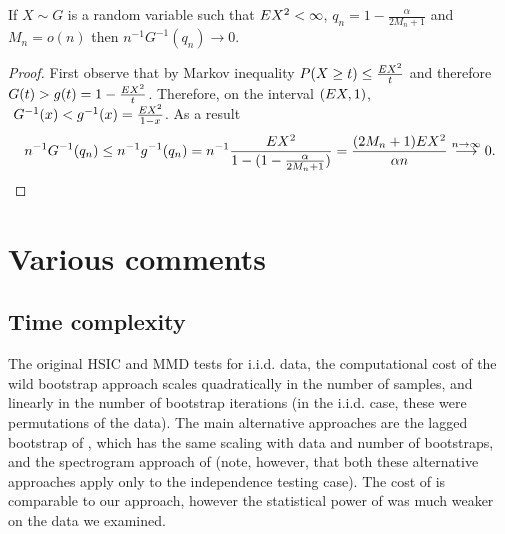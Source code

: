 \begin{lemma}
\label{lem:FoverN}
If $X \sim G$ is a random variable such that $E X^2 <\infty$, $q_{n} = 1-\frac{\alpha}{2M_n+1}$ and $M_n=o(n)$ then $n^{-1} G^{-1}(q_{n}) \to 0$.
\end{lemma}  
\begin{proof}
 First observe that by Markov inequality $P(X \geq t) \leq \frac {E X^2} {t} $ and therefore $G(t) > g(t) = 1 - \frac {E X^2} {t}$.  Therefore, on the interval   $(E X,1)$,  $ \ G^{-1}(x) < g^{-1}(x) = \frac{\ev X^2}{1-x}$. As a result 
 \begin{align}
 \label{eg:aletrnative}
 n^{-1} G^{-1}(q_{n})  \leq  n^{-1} g^{-1}(q_{n})  =n^{-1}  \frac{E X^2} { 1 - (1 -\frac {\alpha} {2M_n+1})}= \frac{(2M_n+1) E X^2  }{\alpha n} \overset{n \to \infty}{\longrightarrow} 0.
 \end{align} 
\end{proof} 

\section{Various comments}

\subsection{Time complexity}
The original HSIC and MMD tests for i.i.d. data, the computational cost of the wild bootstrap approach scales quadratically in the number of samples, and linearly in the number of bootstrap iterations (in the i.i.d. case, these were permutations of the data). The main alternative approaches are the lagged bootstrap of \cite{chwialkowski2014kernel}, which has the same scaling with data and number of bootstraps, and the spectrogram approach of \cite{besserve_statistical_2013} (note, however, that both these alternative approaches apply only to the independence testing case). The cost of \cite{besserve_statistical_2013} is comparable to our approach, however the statistical power of \cite{besserve_statistical_2013} was much weaker on the data we examined.